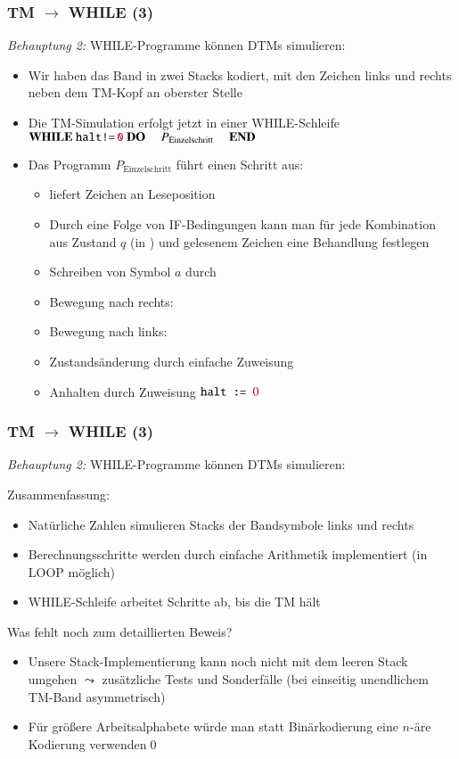 \documentclass[onlymath]{beamer}
\begin{document}
\begin{frame}[t]\frametitle{TM $\to$ WHILE (3)}

\emph{Behauptung 2:} WHILE-Programme können DTMs simulieren:
\medskip

\begin{itemize}
\item Wir haben das Band in zwei Stacks kodiert, mit den Zeichen links und rechts neben dem TM-Kopf an oberster Stelle\pause
\item Die TM-Simulation erfolgt jetzt in einer WHILE-Schleife
	$\textbf{WHILE}~\texttt{halt}\texttt{!=}\,\texttt{\textcolor{purple}{0}}~\textbf{DO}~ \quad P_{\text{Einzelschritt}}~\quad \textbf{END}$
\item Das Programm $P_{\text{Einzelschritt}}$ führt einen Schritt aus:
\begin{itemize}
\item {} liefert Zeichen an Leseposition
\item Durch eine Folge von IF-Bedingungen kann man für jede Kombination aus
Zustand $q$ (in ) und gelesenem Zeichen eine Behandlung festlegen
\item Schreiben von Symbol $a$ durch 
\item Bewegung nach rechts: 
\item Bewegung nach links: 
\item Zustandsänderung durch einfache Zuweisung
\item Anhalten durch Zuweisung $\texttt{halt}\texttt{ := }\textcolor{purple}{0}$
\end{itemize}
\end{itemize}

\end{frame}

\begin{frame}[t]\frametitle{TM $\to$ WHILE (3)}

\emph{Behauptung 2:} WHILE-Programme können DTMs simulieren:
\medskip

\alert{Zusammenfassung:}
\begin{itemize}
\item Natürliche Zahlen simulieren Stacks der Bandsymbole links und rechts
\item Berechnungsschritte werden durch einfache Arithmetik implementiert (in LOOP möglich)
\item WHILE-Schleife arbeitet Schritte ab, bis die TM hält
\end{itemize}
\medskip

\alert{Was fehlt noch zum detaillierten Beweis?}
\begin{itemize}
\item Unsere Stack-Implementierung kann noch nicht mit dem leeren Stack umgehen $\leadsto$ zusätzliche Tests und Sonderfälle (bei einseitig unendlichem TM-Band asymmetrisch)
\item Für größere Arbeitsalphabete würde man statt Binärkodierung eine $n$-äre Kodierung verwenden\qed
\end{itemize}

\end{frame}
\end{document}

